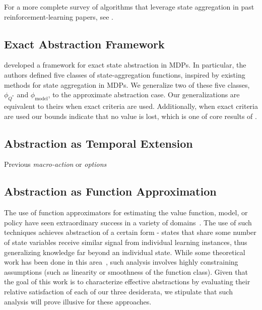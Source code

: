 For a more complete survey of algorithms that leverage state aggregation in past reinforcement-learning papers, see \citet{li2006towards}.

\subsection{Exact Abstraction Framework}

\citet{li2006towards} developed a framework for exact state abstraction in \acp{MDP}. In particular, the authors defined five classes of state-aggregation functions, inspired by existing methods for state aggregation in \acp{MDP}. We generalize two of these five classes, $\phi_{Q^*}$ and $\phi_{\text{model}}$, to the approximate abstraction case. Our generalizations are equivalent to theirs when exact criteria are used. Additionally, when exact criteria are used our bounds indicate that no value is lost, which is one of core results of \citet{li2006towards}.


\subsection{Abstraction as Temporal Extension}
Previous \textit{macro-action} or \textit{options}

\subsection{Abstraction as Function Approximation}

The use of function approximators for estimating the value function, model, or policy have seen extraordinary success in a variety of domains~\cite{mnih2015human,sutton1999policy,baird1995residual,stadie2015incentivizing,ormoneit2002kernel}. The use of such techniques achieves abstraction of a certain form - states that share some number of state variables receive similar signal from individual learning instances, thus generalizing knowledge far beyond an individual state. While some theoretical work has been done in this area~\cite{schoknecht2002optimality,thrun1993issues,parr2008analysis}, such analysis involves highly constraining assumptions (such as linearity or smoothness of the function class). Given that the goal of this work is to characterize effective abstractions by evaluating their relative satisfaction of each of our three desiderata, we stipulate that such analysis will prove illusive for these approaches.